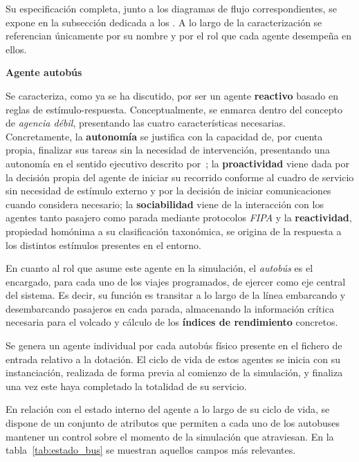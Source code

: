 Su especificación completa, junto a los diagramas de flujo correspondientes, se expone en la subsección dedicada a los
\textbf{}.
A lo largo de la caracterización se referencian únicamente por su nombre y por el rol que cada agente desempeña en ellos.


\medskip
\noindent\textbf{Agente autobús}

Se caracteriza, como ya se ha discutido, por ser un agente \textbf{reactivo} basado en reglas de estímulo-respuesta.
Conceptualmente, se enmarca dentro del concepto de \textit{agencia débil}, presentando las cuatro características
necesarias. Concretamente, la \textbf{autonomía} se justifica con la capacidad de, por cuenta propia, finalizar sus tareas sin 
la necesidad de intervención, presentando una autonomía en el sentido ejecutivo descrito por~\textcite{castelfranchi1995guarantees}; 
la \textbf{proactividad} viene dada por la decisión propia del agente de iniciar su recorrido
conforme al cuadro de servicio sin necesidad de estímulo externo y por la decisión de iniciar comunicaciones cuando considera necesario; 
la \textbf{sociabilidad} viene de la interacción con los agentes tanto
pasajero como parada mediante protocolos \textit{FIPA} y la \textbf{reactividad}, propiedad homónima a su clasificación
taxonómica, se origina de la respuesta a los distintos estímulos presentes en el entorno.

En cuanto al rol que asume este agente en la simulación, el \textit{autobús} es el encargado, para cada uno de los viajes
programados, de ejercer como eje central del sistema. Es decir, su función es transitar a lo largo de la línea 
embarcando y desembarcando pasajeros en cada parada, almacenando la información crítica necesaria para el volcado y 
cálculo de los \textbf{índices de rendimiento} concretos. 

Se genera un agente individual por cada autobús físico presente en el fichero de entrada relativo a la dotación.
El ciclo de vida de estos agentes se inicia con su instanciación, realizada de forma previa al comienzo de la simulación, 
y finaliza una vez este haya completado la totalidad de su servicio.

En relación con el estado interno del agente a lo largo de su ciclo de vida, se dispone de un conjunto de atributos que
permiten a cada uno de los autobuses mantener un control sobre el momento de la simulación que atraviesan.
En la tabla~\ref{tab:estado_bus} se muestran aquellos campos más relevantes.

